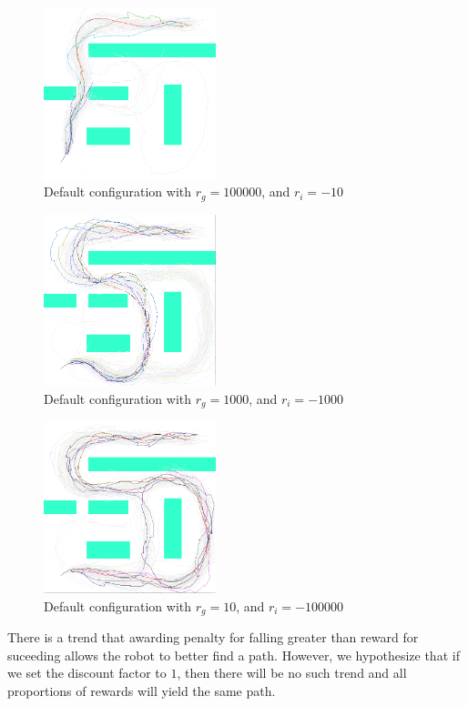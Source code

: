 \documentclass[a4paper]{article}
\begin{document}
\begin{figure}
\caption{Default configuration with $r_g=100000$, and $r_i=-10$}
\label{f:b_veryhigoal}
\centerline{\includegraphics[width=5cm]{b_veryhigoal.png}}
\end{figure}

\begin{figure}
\caption{Default configuration with $r_g=1000$, and $r_i=-1000$}
\label{f:b_eqgoal}
\centerline{\includegraphics[width=5cm]{b_eqgoal.png}}
\end{figure}

\begin{figure}
\caption{Default configuration with $r_g=10$, and $r_i=-100000$}
\label{f:b_verylowgoal}
\centerline{\includegraphics[width=5cm]{b_verylowgoal.png}}
\end{figure}

There is a trend that awarding penalty for falling greater than reward for
suceeding allows the robot to better find a path. However, we hypothesize that
if we set the discount factor to $1$, then there will be no such trend and all
proportions of rewards will yield the same path.
\end{document}
